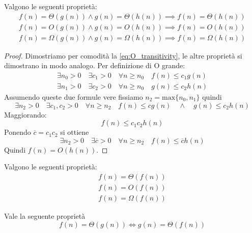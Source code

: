 \begin{teorbox}
		Valgono le seguenti proprietà:
	\begin{eqnarray}
		f(n)=\Theta(g(n)) \wedge g(n)=\Theta(h(n)) \implies f(n)=\Theta(h(n)) \\
		f(n)=O(g(n)) \wedge g(n)=O(h(n)) \implies f(n)=O(h(n)) \label{eq:O_transitivity}\\
		f(n)=\Omega(g(n)) \wedge g(n)=\Omega(h(n)) \implies f(n)=\Omega(h(n))
	\end{eqnarray}
\end{teorbox}
\begin{proof}
	Dimostriamo per comodità la \ref{eq:O_transitivity}, le altre proprietà si dimostrano in modo analogo. Per definizione di O grande:
	\begin{eqnarray}
		\exists n_{0} > 0 \quad \exists c_{1}>0 \quad \forall n \geq n_{0} \quad f(n)\leq c_{1}g(n) \nonumber \\
		\exists n_{1} > 0 \quad \exists c_{2}>0 \quad \forall n \geq n_{0} \quad g(n)\leq c_{2}h(n) \nonumber
	\end{eqnarray}
	Assumendo queste due formule vere fissiamo $n_{2}=\mbox{max}\{n_{0},n_{1}\}$ quindi
	\begin{displaymath}
		\exists n_{2} > 0 \quad \exists c_{1},c_{2}>0 \quad \forall n \geq n_{2} \quad f(n)\leq cg(n) \quad \wedge \quad g(n) \leq c_{2}h(n)
	\end{displaymath}
	Maggiorando:
	\begin{displaymath}
	f(n) \leq c_{1}c_{2}h(n)
	\end{displaymath}
	Ponendo $\overline{c}=c_{1}c_{2}$ si ottiene
	\begin{displaymath}
		\exists n_{2} > 0 \quad \exists \overline{c}>0 \quad \forall n \geq n_{2} \quad f(n) \leq \overline{c}h(n)
	\end{displaymath}
	Quindi $f(n)=O(h(n))$.
\end{proof}


\begin{teorbox}
		Valgono le seguenti proprietà:
	\begin{eqnarray}
		f(n)=\Theta(f(n)) \\
		f(n)=O(f(n)) \\
		f(n)=\Omega(f(n))
	\end{eqnarray}
\end{teorbox}

\begin{teorbox}
		Vale la seguente proprietà
	\begin{equation}
		f(n)=\Theta(g(n)) \Leftrightarrow g(n)=\Theta(f(n))
	\end{equation}
\end{teorbox}


